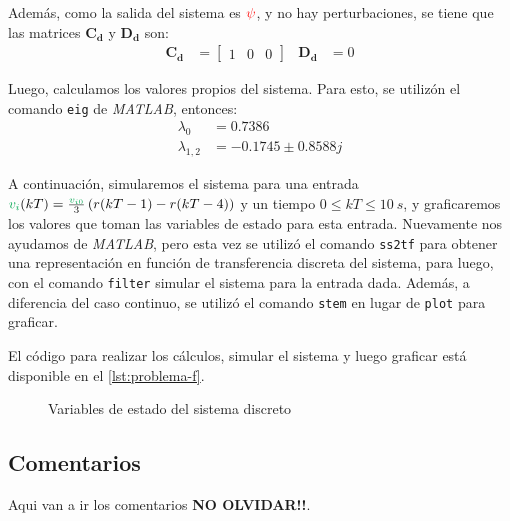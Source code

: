 Además, como la salida del sistema es $\mathbin{\color{red}\psi}$, y no hay perturbaciones,
se tiene que las matrices $\pmb{C_{d}}$ y $\pmb{D_{d}}$ son:
\begin{align}
  \pmb{C_{d}} &= \begin{bmatrix}
      1 & 0 & 0
  \end{bmatrix} &
  \pmb{D_{d}} &= 0
\end{align}

Luego, calculamos los valores propios del sistema. Para esto, se utilizón el
comando \verb|eig| de \textit{MATLAB}, entonces:
\begin{align}
  \lambda_{0} &=  0.7386 \\
  \lambda_{1,2} &=  -0.1745 \pm 0.8588j
\end{align}

A continuación, simularemos el sistema para una entrada
$\verd{v_{i}}(kT) = \frac{\verd{v_{i0}}}{3}\left(r(kT-1) - r(kT-4)\right)$
y un tiempo $0 \leq kT \leq 10\ \unit{s}$, y graficaremos los valores que
toman las variables de estado para esta entrada. Nuevamente nos ayudamos
de \textit{MATLAB}, pero esta vez se utilizó el comando \verb|ss2tf| para
obtener una representación en función de transferencia discreta del sistema,
para luego, con el comando \verb|filter| simular el sistema para la entrada
dada. Además, a diferencia del caso continuo, se utilizó el comando \verb|stem|
en lugar de \verb|plot| para graficar.

El código para realizar los cálculos, simular el sistema y luego graficar está
disponible en el \autoref{lst:problema-f}.

\begin{figure}[h]
  \centering
  
  \caption{Variables de estado del sistema discreto}\label{fig:estado-discreto}
\end{figure}

\subsection{Comentarios}

Aqui van a ir los comentarios \textbf{NO OLVIDAR!!}.

